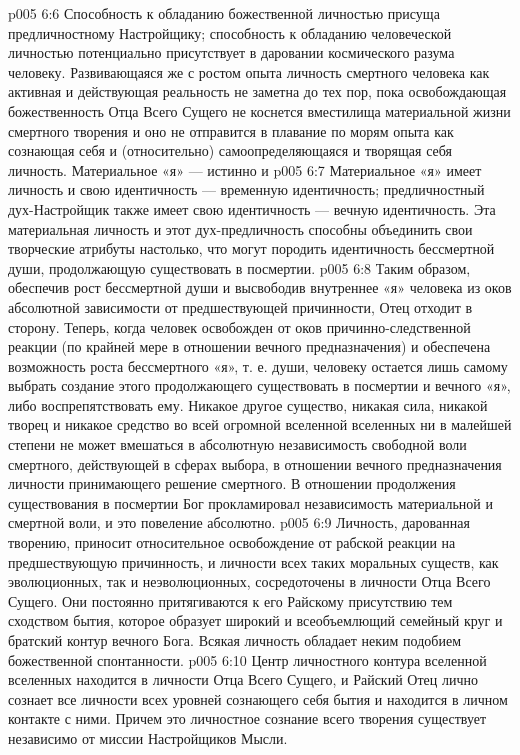 \vs p005 6:6 Способность к обладанию божественной личностью присуща предличностному Настройщику; способность к обладанию человеческой личностью потенциально присутствует в даровании космического разума человеку. Развивающаяся же с ростом опыта личность смертного человека как активная и действующая реальность не заметна до тех пор, пока освобождающая божественность Отца Всего Сущего не коснется вместилища материальной жизни смертного творения и оно не отправится в плавание по морям опыта как сознающая себя и (относительно) самоопределяющаяся и творящая себя личность. Материальное «я» --- истинно и 
\vs p005 6:7 \pc Материальное «я» имеет личность и свою идентичность --- временную идентичность; предличностный дух\hyp{}Настройщик также имеет свою идентичность --- вечную идентичность. Эта материальная личность и этот дух\hyp{}предличность способны объединить свои творческие атрибуты настолько, что могут породить идентичность бессмертной души, продолжающую существовать в посмертии.
\vs p005 6:8 Таким образом, обеспечив рост бессмертной души и высвободив внутреннее «я» человека из оков абсолютной зависимости от предшествующей причинности, Отец отходит в сторону. Теперь, когда человек освобожден от оков причинно\hyp{}следственной реакции (по крайней мере в отношении вечного предназначения) и обеспечена возможность роста бессмертного «я», т. е. души, человеку остается лишь самому выбрать создание этого продолжающего существовать в посмертии и вечного «я», либо воспрепятствовать ему. Никакое другое существо, никакая сила, никакой творец и никакое средство во всей огромной вселенной вселенных ни в малейшей степени не может вмешаться в абсолютную независимость свободной воли смертного, действующей в сферах выбора, в отношении вечного предназначения личности принимающего решение смертного. В отношении продолжения существования в посмертии Бог прокламировал независимость материальной и смертной воли, и это повеление абсолютно.
\vs p005 6:9 \pc Личность, дарованная творению, приносит относительное освобождение от рабской реакции на предшествующую причинность, и личности всех таких моральных существ, как эволюционных, так и неэволюционных, сосредоточены в личности Отца Всего Сущего. Они постоянно притягиваются к его Райскому присутствию тем сходством бытия, которое образует широкий и всеобъемлющий семейный круг и братский контур вечного Бога. Всякая личность обладает неким подобием божественной спонтанности.
\vs p005 6:10 \pc Центр личностного контура вселенной вселенных находится в личности Отца Всего Сущего, и Райский Отец лично сознает все личности всех уровней сознающего себя бытия и находится в личном контакте с ними. Причем это личностное сознание всего творения существует независимо от миссии Настройщиков Мысли.
